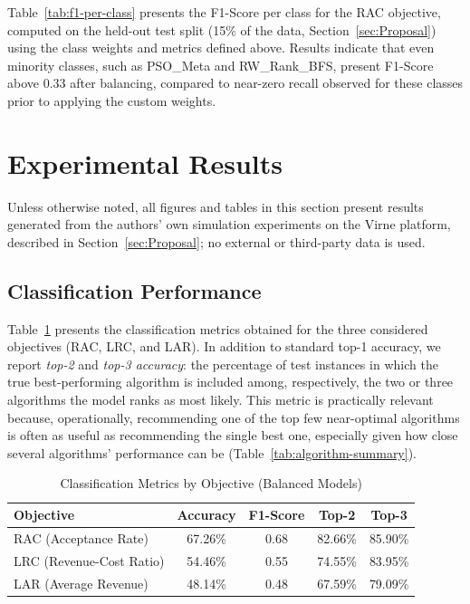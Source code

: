 \documentclass[runningheads]{llncs}
\begin{document}
Table~\ref{tab:f1-per-class} presents the F1-Score per class for the RAC objective, computed on the held-out test split (15\% of the data, Section~\ref{sec:Proposal}) using the class weights and metrics defined above. Results indicate that even minority classes, such as PSO\_Meta and RW\_Rank\_BFS, present F1-Score above 0.33 after balancing, compared to near-zero recall observed for these classes prior to applying the custom weights.

\section{Experimental Results}
\label{sec:Results}

Unless otherwise noted, all figures and tables in this section present results generated from the authors' own simulation experiments on the Virne platform, described in Section~\ref{sec:Proposal}; no external or third-party data is used.

\subsection{Classification Performance}

Table~\ref{tab:classification-metrics} presents the classification metrics obtained for the three considered objectives (RAC, LRC, and LAR). In addition to standard top-1 accuracy, we report \emph{top-2} and \emph{top-3 accuracy}: the percentage of test instances in which the true best-performing algorithm is included among, respectively, the two or three algorithms the model ranks as most likely. This metric is practically relevant because, operationally, recommending one of the top few near-optimal algorithms is often as useful as recommending the single best one, especially given how close several algorithms' performance can be (Table~\ref{tab:algorithm-summary}).

\begin{table}[htbp]
\centering
\caption{Classification Metrics by Objective (Balanced Models)}
\label{tab:classification-metrics}
\begin{tabular}{lcccc}
\toprule
\textbf{Objective} & \textbf{Accuracy} & \textbf{F1-Score} & \textbf{Top-2} & \textbf{Top-3} \\
\midrule
RAC (Acceptance Rate) & 67.26\% & 0.68 & 82.66\% & 85.90\% \\
LRC (Revenue-Cost Ratio) & 54.46\% & 0.55 & 74.55\% & 83.95\% \\
LAR (Average Revenue) & 48.14\% & 0.48 & 67.59\% & 79.09\% \\
\bottomrule
\end{tabular}
\end{table}
\end{document}
